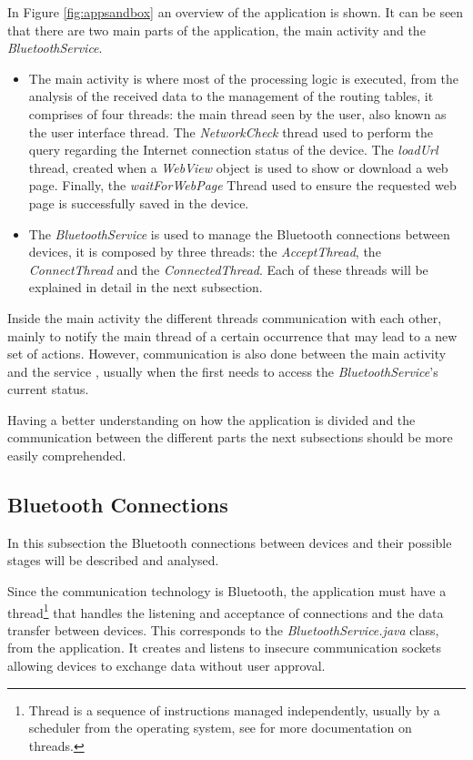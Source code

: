 In Figure \ref{fig:appsandbox} an overview of the application is shown. It can be seen that there are two main parts of the application, the main activity and the \textit{BluetoothService}.
\begin{itemize}

\item The main activity is where most of the processing logic is executed, from the analysis of the received data to the management of the routing tables, it comprises of four threads: the main thread seen by the user, also known as the user interface thread. The \textit{NetworkCheck} thread used to perform the query regarding the Internet connection status of the device. The \textit{loadUrl} thread, created when a \textit{WebView} object is used to show or download a web page. Finally, the \textit{waitForWebPage} Thread used to ensure the requested web page is successfully saved in the device.

\item The \textit{BluetoothService} is used to manage the Bluetooth connections between devices, it is composed by three threads: the \textit{AcceptThread}, the \textit{ConnectThread} and the \textit{ConnectedThread}. Each of these threads will be explained in detail in the next subsection.

\end{itemize}

Inside the main activity the different threads communication with each other, mainly to notify the main thread of a certain occurrence that may lead to a new set of actions. However, communication is also done between the main activity and the service , usually when the first needs to access the \textit{BluetoothService}'s current status.

Having a better understanding on how the application is divided and the communication between the different parts the next subsections should be more easily comprehended.

\subsection{Bluetooth Connections}
\label{subsec:btconn}

In this subsection the Bluetooth connections between devices and their possible stages will be described and analysed.

Since the communication technology is Bluetooth, the application must have a thread\footnote{Thread is a sequence of instructions managed independently, usually by a scheduler from the operating system, see \cite{threads} for more documentation on threads.} that handles the listening and acceptance of connections and the data transfer between devices. This corresponds to the \textit{BluetoothService.java} class, from the application. It creates and listens to insecure communication sockets allowing devices to exchange data without user approval.

